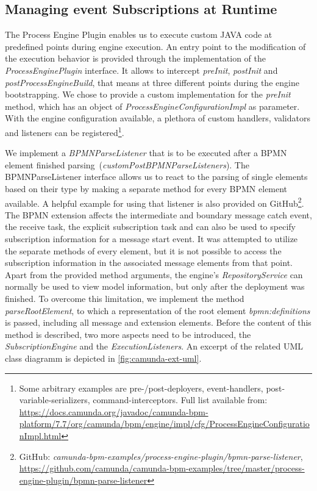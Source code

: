 


\subsection{Managing event Subscriptions at Runtime}
The Process Engine Plugin enables us to execute custom JAVA code at predefined points during engine execution.
An entry point to the modification of the execution behavior is provided through the implementation of the \textit{ProcessEnginePlugin} interface. It allows to intercept \textit{preInit}, \textit{postInit} and \textit{postProcessEngineBuild}, that means at three different points during the engine bootstrapping.
We chose to provide a custom implementation for the \textit{preInit} method, which has an object of \textit{ProcessEngineConfigurationImpl} as parameter.
With the engine configuration available, a plethora of custom handlers, validators and listeners can be registered\footnote{Some arbitrary examples are pre-/post-deployers, event-handlers, post-variable-serializers, command-interceptors. Full list available from: \url{https://docs.camunda.org/javadoc/camunda-bpm-platform/7.7/org/camunda/bpm/engine/impl/cfg/ProcessEngineConfigurationImpl.html}}.

We implement a \textit{BPMNParseListener} that is to be executed after a BPMN element finished parsing~(\textit{customPostBPMNParseListeners}).
The BPMNParseListener interface allows us to react to the parsing of single elements based on their type by making a separate method for every BPMN element available.
A helpful example for using that listener is also provided on GitHub\footnote{GitHub: \textit{camunda-bpm-examples/process-engine-plugin/bpmn-parse-listener}, \url{https://github.com/camunda/camunda-bpm-examples/tree/master/process-engine-plugin/bpmn-parse-listener}}.
The BPMN extension affects the intermediate and boundary message catch event, the receive task, the explicit subscription task and can also be used to specify subscription information for a message start event.
It was attempted to utilize the separate methods of every element, but it is not possible to access the subscription information in the associated message elements from that point. Apart from the provided method arguments, the engine's \textit{RepositoryService} can normally be used to view model information, but only after the deployment was finished.  
To overcome this limitation, we implement the method \textit{parseRootElement}, to which a representation of the root element \textit{bpmn:definitions} is passed, including all message and extension elements. 
Before the content of this method is described, two more aspects need to be introduced, the \textit{SubscriptionEngine} and the \textit{ExecutionListeners}. An excerpt of the related UML class diagramm is depicted in \autoref{fig:camunda-ext-uml}.


